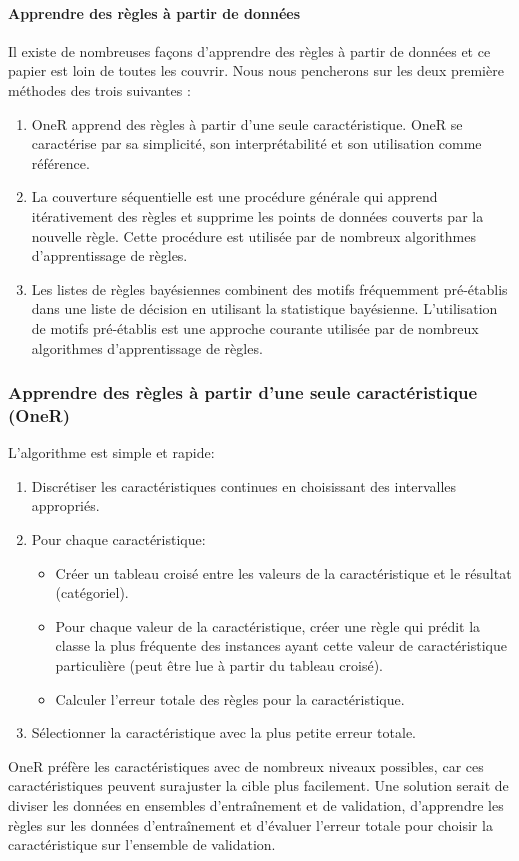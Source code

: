 \paragraph{Apprendre des règles à partir de données}
Il existe de nombreuses façons d'apprendre des règles à partir de données et ce papier est loin de toutes les couvrir. Nous nous pencherons sur les deux première méthodes des trois suivantes :
\begin{enumerate}
    \item OneR apprend des règles à partir d'une seule caractéristique. OneR se caractérise par sa simplicité, son interprétabilité et son utilisation comme référence.
    \item La couverture séquentielle est une procédure générale qui apprend itérativement des règles et supprime les points de données couverts par la nouvelle règle. Cette procédure est utilisée par de nombreux algorithmes d'apprentissage de règles.
    \item Les listes de règles bayésiennes combinent des motifs fréquemment pré-établis dans une liste de décision en utilisant la statistique bayésienne. L'utilisation de motifs pré-établis est une approche courante utilisée par de nombreux algorithmes d'apprentissage de règles. 
\end{enumerate}



\subsubsection{Apprendre des règles à partir d'une seule caractéristique (OneR)}

L'algorithme est simple et rapide:
\begin{enumerate}
    \item Discrétiser les caractéristiques continues en choisissant des intervalles appropriés.
    \item Pour chaque caractéristique:
    \begin{itemize}
        \item Créer un tableau croisé entre les valeurs de la caractéristique et le résultat (catégoriel).
        \item Pour chaque valeur de la caractéristique, créer une règle qui prédit la classe la plus fréquente des instances ayant cette valeur de caractéristique particulière (peut être lue à partir du tableau croisé).
        \item Calculer l'erreur totale des règles pour la caractéristique.
    \end{itemize}
    \item Sélectionner la caractéristique avec la plus petite erreur totale.
\end{enumerate}
OneR préfère les caractéristiques avec de nombreux niveaux possibles, car ces caractéristiques peuvent surajuster la cible plus facilement. Une solution serait de diviser les données en ensembles d'entraînement et de validation, d'apprendre les règles sur les données d'entraînement et d'évaluer l'erreur totale pour choisir la caractéristique sur l'ensemble de validation.

